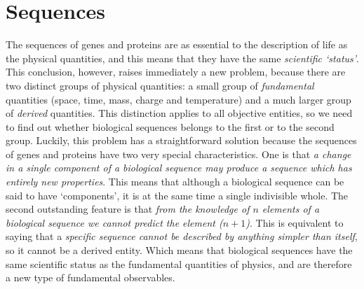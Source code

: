 \documentclass[12pt]{article}
\begin{document}
\section{Sequences}
The sequences of genes and proteins are as essential to the description of life as the physical quantities, and this means that they have the same \textit{scientific `status'}. This conclusion, however, raises immediately a new problem, because there are two distinct groups of physical quantities: a small group of \textit{fundamental} quantities (space, time, mass, charge and temperature) and a much larger group of \textit{derived} quantities. This distinction applies to all objective entities, so we need to find out whether biological sequences belongs to the first or to the second group. Luckily, this problem has a straightforward solution because the sequences of genes and proteins have two very special characteristics. One is that \textit{a change in a single component of a biological sequence may produce a sequence which has entirely new properties}. This means that although a biological sequence can be said to have `components', it is at the same time a single indivisible whole. The second outstanding feature is that \textit{from the knowledge of $n$ elements of a biological sequence we cannot predict the element ($n+1$)}. This is equivalent to saying that a \textit{specific sequence cannot be described by anything simpler than itself}, so it cannot be a derived entity. Which means that biological sequences have the same scientific status as the fundamental quantities of physics, and are therefore a new type of fundamental observables. 


\hypertarget{signs}{}
\end{document}
